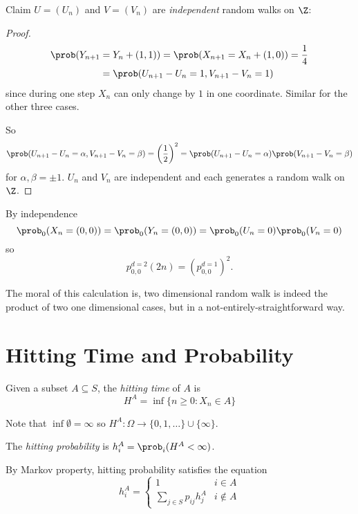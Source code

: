 \documentclass[a4paper]{article}
\begin{document}
Claim \(U = (U_n)\) and \(V = (V_n)\) are \emph{independent} random walks on \(\Z\):

\begin{proof}
  \begin{align*}
    \prob(Y_{n+1} &= Y_n+ (1,1)) = \prob(X_{n+1} = X_n + (1,0)) = \frac{1}{4} \\
                  &= \prob(U_{n+1} - U_n = 1, V_{n+1} - V_n = 1)
  \end{align*}
  since during one step \(X_n\) can only change by \(1\) in one coordinate. Similar for the other three cases.

  So
  \[
    \prob(U_{n+1} - U_n = \alpha, V_{n+1} - V_n = \beta) = \left( \frac{1}{2} \right)^2 = \prob(U_{n+1} - U_n = \alpha) \prob(V_{n+1} - V_n = \beta)
  \]
  for \(\alpha, \beta = \pm 1\). \(U_n\) and \(V_n\) are independent and each generates a random walk on \(\Z\).
\end{proof}

By independence
\[
  \prob_0(X_n = (0,0)) = \prob_0(Y_n = (0,0)) = \prob_0(U_n = 0) \prob_0(V_n = 0)
\]
so
\[
  p_{0,0}^{d=2}(2n) = \left( p_{0,0}^{d=1} \right)^2.
\]

The moral of this calculation is, two dimensional random walk is indeed the product of two one dimensional cases, but in a not-entirely-straightforward way.

\section{Hitting Time and Probability}

\begin{definition}
  Given a subset \(A \subseteq S\), the \emph{hitting time} of \(A\) is
  \[
    H^A = \inf\{n\geq 0: X_n \in A \}
  \]
\end{definition}
Note that \(\inf \emptyset = \infty\) so \(H^A: \Omega \to \{0, 1, \dots\} \cup \{\infty\}\).

\begin{definition}
  The \emph{hitting probability} is \(h_i^A = \prob_i(H^A < \infty)\).
\end{definition}

By Markov property, hitting probability satisfies the equation
\begin{equation}
  \label{eqn:hitting prob}
  h_i^A =
  \begin{cases}
    1 & i \in A \\
    \sum_{j \in S} p_{ij}h_j^A & i \notin A
  \end{cases}
  \tag{\(\ast\)}
\end{equation}
\end{document}
